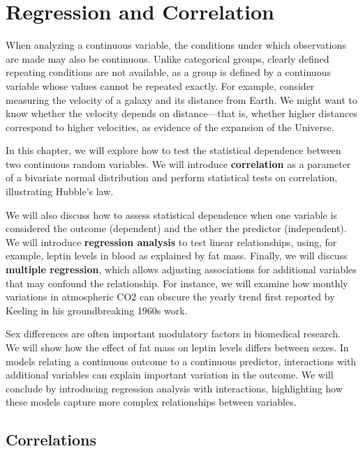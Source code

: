 \documentclass[
]{book}
\begin{document}
\hypertarget{regression-and-correlation}{%
\chapter{Regression and Correlation}\label{regression-and-correlation}}

When analyzing a continuous variable, the conditions under which observations are made may also be continuous. Unlike categorical groups, clearly defined repeating conditions are not available, as a group is defined by a continuous variable whose values cannot be repeated exactly. For example, consider measuring the velocity of a galaxy and its distance from Earth. We might want to know whether the velocity depends on distance---that is, whether higher distances correspond to higher velocities, as evidence of the expansion of the Universe.

In this chapter, we will explore how to test the statistical dependence between two continuous random variables. We will introduce \textbf{correlation} as a parameter of a bivariate normal distribution and perform statistical tests on correlation, illustrating Hubble's law.

We will also discuss how to assess statistical dependence when one variable is considered the outcome (dependent) and the other the predictor (independent). We will introduce \textbf{regression analysis} to test linear relationships, using, for example, leptin levels in blood as explained by fat mass. Finally, we will discuss \textbf{multiple regression}, which allows adjusting associations for additional variables that may confound the relationship. For instance, we will examine how monthly variations in atmospheric CO2 can obscure the yearly trend first reported by Keeling in his groundbreaking 1960s work.

Sex differences are often important modulatory factors in biomedical research. We will show how the effect of fat mass on leptin levels differs between sexes. In models relating a continuous outcome to a continuous predictor, interactions with additional variables can explain important variation in the outcome. We will conclude by introducing regression analysis with interactions, highlighting how these models capture more complex relationships between variables.

\hypertarget{correlations}{%
\section{Correlations}\label{correlations}}
\end{document}
